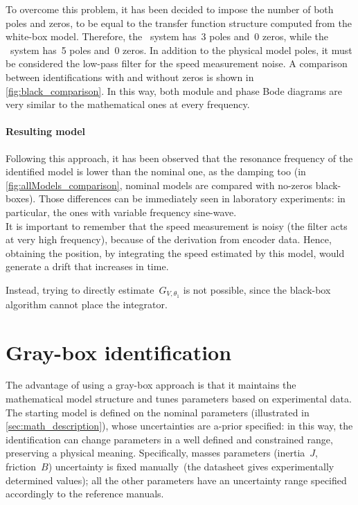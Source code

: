 To overcome this problem, it has been decided to impose the number of both poles and zeros, to be equal to the transfer function structure computed from the white-box model. Therefore, the \onedof\ system has~3 poles and~0 zeros, while the \twodof\ system has~5 poles and~0 zeros.
In addition to the physical model poles, it must be considered the low-pass filter for the speed measurement noise.  A comparison between identifications with and without zeros is shown in \cref{fig:black_comparison}.
In this way, both module and phase Bode diagrams are very similar to the mathematical ones at every frequency.

\paragraph{Resulting model}

Following this approach, it has been observed that the resonance frequency of the identified model is lower than the nominal one, as the damping too (in \cref{fig:allModels_comparison}, nominal models are compared with no-zeros black-boxes).
Those differences can be immediately seen in laboratory experiments: in particular, the ones with variable frequency sine-wave. \\
It is important to remember that the speed measurement is noisy (the filter acts at very high frequency), because of the derivation from encoder data. Hence, obtaining the position, by integrating the speed estimated by this model, would generate a drift that increases in time.

Instead, trying to directly estimate~$G_{V,\theta_1}$ is not possible, since the black-box algorithm cannot place the integrator.

\section{Gray-box identification} \label{sec:gray_b_id}

\par The advantage of using a gray-box approach is that it maintains the mathematical model structure and tunes parameters based on experimental data. The starting model is defined on the nominal parameters (illustrated in \cref{sec:math_description}), whose uncertainties are a-prior specified: in this way, the identification can change parameters in a well defined and constrained range, preserving a physical meaning. Specifically, masses parameters (inertia~$J$, friction~$B$) uncertainty is fixed manually~(the datasheet gives experimentally determined values); all the other parameters have an uncertainty range specified accordingly to the reference manuals.

